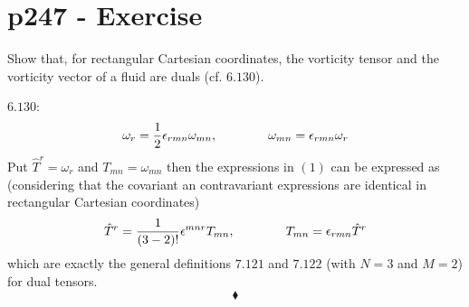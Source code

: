 \section{p247 - Exercise }
\begin{tcolorbox}
Show that, for rectangular Cartesian coordinates, the vorticity tensor and the vorticity vector of a fluid are duals (cf. $\mathbf{6.130}$).
\end{tcolorbox}
$\mathbf{6.130}$:
\begin{align}
\omega_r=\frac{1}{2}\epsilon_{rmn}\omega_{mn},\quad\quad\quad\quad \omega_{mn}=\epsilon_{rmn}\omega_r
\end{align}
Put $\hat{T}^r= \omega_r$ and $T_{mn} = \omega_{mn}$
then the expressions in $(1)$ can be expressed as (considering that the covariant an contravariant expressions are identical in rectangular Cartesian coordinates) 
\begin{align}
\hat{T}^r=\frac{1}{(3-2)!}\epsilon^{mnr}T_{mn},\quad\quad\quad\quad T_{mn}=\epsilon_{rmn}\hat{T}^r
\end{align}
which are exactly the general definitions $\mathbf{7.121}$ and $\mathbf{7.122}$ (with $N=3$ and $M=2$) for dual tensors.
$$\blacklozenge$$
\newpage



